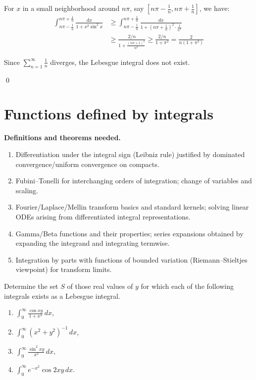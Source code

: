 \begin{enumerate}[label=(\alph*)]
For $x$ in a small neighborhood around $n\pi$, say $[n\pi - \frac{1}{n}, n\pi + \frac{1}{n}]$, we have:
\begin{align*}
\int_{n\pi - \frac{1}{n}}^{n\pi + \frac{1}{n}} \frac{dx}{1 + x^2 \sin^2 x} &\geq \int_{n\pi - \frac{1}{n}}^{n\pi + \frac{1}{n}} \frac{dx}{1 + (n\pi + \frac{1}{n})^2 \cdot \frac{1}{n^2}} \\
&\geq \frac{2/n}{1 + \frac{(n\pi + 1)^2}{n^2}} \geq \frac{2/n}{1 + \pi^2} = \frac{2}{n(1 + \pi^2)}
\end{align*}

Since $\sum_{n=1}^{\infty} \frac{1}{n}$ diverges, the Lebesgue integral does not exist.
\end{enumerate}\qed
\section{Functions defined by integrals}

\noindent\textbf{Definitions and theorems needed.}
\begin{enumerate}[label=(\alph*)]
\item Differentiation under the integral sign (Leibniz rule) justified by dominated convergence/uniform convergence on compacts.
\item Fubini–Tonelli for interchanging orders of integration; change of variables and scaling.
\item Fourier/Laplace/Mellin transform basics and standard kernels; solving linear ODEs arising from differentiated integral representations.
\item Gamma/Beta functions and their properties; series expansions obtained by expanding the integrand and integrating termwise.
\item Integration by parts with functions of bounded variation (Riemann–Stieltjes viewpoint) for transform limits.
\end{enumerate}



\begin{problembox}
\begin{problemstatement}
Determine the set $S$ of those real values of $y$ for which each of the following integrals exists as a Lebesgue integral.
\begin{enumerate}[label=(\alph*)]
\item $\int_{0}^{\infty} \frac{\cos xy}{1 + x^2} \, dx$,
\item $\int_{0}^{\infty} (x^2 + y^2)^{-1} \, dx$,
\item $\int_{0}^{\infty} \frac{\sin^2 xy}{x^2} \, dx$,
\item $\int_{0}^{\infty} e^{-x^2} \cos 2xy \, dx.$
\end{enumerate}
\end{problemstatement}
\end{problembox}

